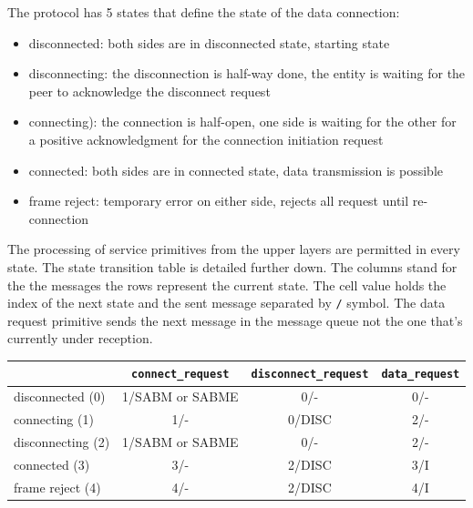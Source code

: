 \documentclass[a4paper]{article}
\begin{document}
The protocol has 5 states that define the state of the data connection:
\begin{itemize}
    \item disconnected: both sides are in disconnected state, starting state
    \item disconnecting: the disconnection is half-way done, the entity is waiting for the peer to acknowledge the
          disconnect request
    \item connecting): the connection is half-open, one side is waiting for the other for a positive acknowledgment for the
          connection initiation request
    \item connected: both sides are in connected state, data transmission is possible
    \item frame reject: temporary error on either side, rejects all request until re-connection
\end{itemize}

The processing of service primitives from the upper layers are permitted in every state. The state transition table is
detailed further down. The columns stand for the the messages the rows represent the current state. The cell value
holds the index of the next state and the sent message separated by \verb./. symbol. The data
request primitive sends the next message in the message queue not the one that's currently under reception.

{\footnotesize
\begin{center}
    \begin{tabular}{|l|c|c|c|}
        \hline
                          & \verb!connect_request! & \verb!disconnect_request! & \verb!data_request!  \\
        \hline
        disconnected (0)  & 1/SABM or SABME             & 0/-                         & 0/-                          \\
        \hline
        connecting (1)    & 1/-                         & 0/DISC                      & 2/-                          \\
        \hline
        disconnecting (2) & 1/SABM or SABME             & 0/-                         & 2/-                          \\
        \hline
        connected (3)     & 3/-                         & 2/DISC                      & 3/I                          \\
        \hline
        frame reject (4)  & 4/-                         & 2/DISC                      & 4/I                          \\
        \hline
    \end{tabular}
\end{center}
}
\end{document}
